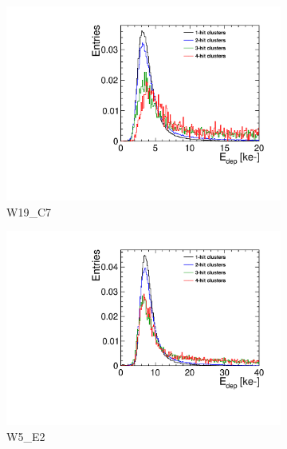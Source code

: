 \begin{figure}[htbp] \centering
  \begin{subfigure}[b]{0.33\textwidth}
    \includegraphics[width=\textwidth]{./figures/Calibration/Edep_Clusters_W0019_C07.pdf}
    \caption{W19\_C7}
  \end{subfigure} \hfill
  \begin{subfigure}[b]{0.33\textwidth}
    \includegraphics[width=\textwidth]{./figures/Calibration/Edep_Clusters_W0005_E02.pdf}
    \caption{W5\_E2}
  \end{subfigure}\hfill
  \begin{subfigure}[b]{0.33\textwidth}

\end{subfigure}
\end{figure}
